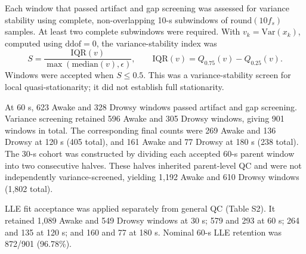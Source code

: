 Each window that passed artifact and gap screening was assessed for variance stability using complete, non-overlapping 10-s subwindows of $\mathrm{round}(10f_s)$ samples. At least two complete subwindows were required. With $v_k=\mathrm{Var}(x_k)$, computed using $\mathrm{ddof}=0$, the variance-stability index was
\[ S=\frac{\mathrm{IQR}(v)}{\max(\mathrm{median}(v),\epsilon)},\qquad \mathrm{IQR}(v)=Q_{0.75}(v)-Q_{0.25}(v). \]
Windows were accepted when $S\leq0.5$. This was a variance-stability screen for local quasi-stationarity; it did not establish full stationarity.

At 60 s, 623 Awake and 328 Drowsy windows passed artifact and gap screening. Variance screening retained 596 Awake and 305 Drowsy windows, giving 901 windows in total. The corresponding final counts were 269 Awake and 136 Drowsy at 120 s (405 total), and 161 Awake and 77 Drowsy at 180 s (238 total). The 30-s cohort was constructed by dividing each accepted 60-s parent window into two consecutive halves. These halves inherited parent-level QC and were not independently variance-screened, yielding 1,192 Awake and 610 Drowsy windows (1,802 total).

LLE fit acceptance was applied separately from general QC (Table S2). It retained 1,089 Awake and 549 Drowsy windows at 30 s; 579 and 293 at 60 s; 264 and 135 at 120 s; and 160 and 77 at 180 s. Nominal 60-s LLE retention was 872/901 (96.78\%).

